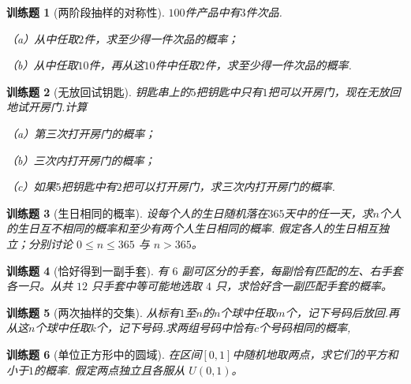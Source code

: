 \documentclass[UTF8,12pt,a4paper,fontset=fandol]{ctexbook}
\newtheorem{exercise}{训练题}[section]
\begin{document}
\begin{exercise}[两阶段抽样的对称性]\label{q:Y1.5}
$100$件产品中有$3$件次品.

（a）从中任取$2$件，求至少得一件次品的概率；

（b）从中任取$10$件，再从这$10$件中任取$2$件，求至少得一件次品的概率.\par{}\end{exercise}

\begin{exercise}[无放回试钥匙]\label{q:Y1.7}
钥匙串上的$5$把钥匙中只有$1$把可以开房门，现在无放回地试开房门.计算

（a）第三次打开房门的概率；

（b）三次内打开房门的概率；

（c）如果$5$把钥匙中有$2$把可以打开房门，求三次内打开房门的概率.\par{}\end{exercise}

\begin{exercise}[生日相同的概率]\label{q:Y1.8}
设每个人的生日随机落在$365$天中的任一天，求$n$个人的生日互不相同的概率和至少有两个人生日相同的概率. 假定各人的生日相互独立；分别讨论 $0\le n\le365$ 与 $n>365$。\par{}\end{exercise}

\begin{exercise}[恰好得到一副手套]\label{q:Y1.9}
有 $6$ 副可区分的手套，每副恰有匹配的左、右手套各一只。从共 $12$ 只手套中等可能地选取 $4$ 只，求恰好含一副匹配手套的概率。\par{}\end{exercise}

\begin{exercise}[两次抽样的交集]\label{q:Y1.10}
从标有$1$至$n$的$n$个球中任取$m$个，记下号码后放回.再从这$n$个球中任取$k$个，记下号码.求两组号码中恰有$c$个号码相同的概率,\par{}\end{exercise}

\begin{exercise}[单位正方形中的圆域]\label{q:Y1.11}
在区间$[0,1]$中随机地取两点，求它们的平方和小于$1$的概率. 假定两点独立且各服从 $U(0,1)$。\par{}\end{exercise}
\end{document}
